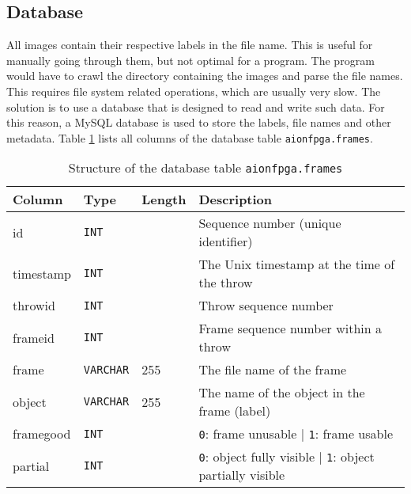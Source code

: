 \subsection{Database}
\label{subsec:database}

All images contain their respective labels in the file name.
This is useful for manually going through them, but not optimal for a program.
The program would have to crawl the directory containing the images and parse the file names.
This requires file system related operations, which are usually very slow.
The solution is to use a database that is designed to read and write such data.
For this reason, a MySQL database is used to store the labels, file names and other metadata.
Table \ref{tab:tab_frames_structure} lists all columns of the database table \texttt{aionfpga.frames}.

\begin{table}[hb]
  \caption{Structure of the database table \texttt{aionfpga.frames}}
  \label{tab:tab_frames_structure}
  \centering
  \begin{tabular}{llll}
    \toprule
    \textbf{Column} & \textbf{Type} & \textbf{Length} & \textbf{Description} \\
    \midrule
    id & \texttt{INT} &  & Sequence number (unique identifier) \\
    timestamp & \texttt{INT} &  & The Unix timestamp at the time of the throw \\
    throwid & \texttt{INT} &  & Throw sequence number \\
    frameid & \texttt{INT} &  & Frame sequence number within a throw \\
    frame & \texttt{VARCHAR} & 255 & The file name of the frame \\
    object & \texttt{VARCHAR} & 255 & The name of the object in the frame (label) \\
    framegood & \texttt{INT} &  & \texttt{0}: frame unusable | \texttt{1}: frame usable \\
    partial & \texttt{INT} &  & \texttt{0}: object fully visible | \texttt{1}: object partially visible \\
    \bottomrule
  \end{tabular}
\end{table}
